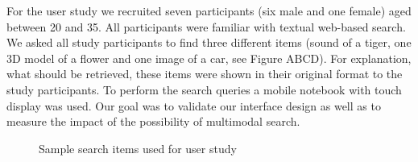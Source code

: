 \documentclass[runningheads,a4paper]{llncs} \usepackage[utf8]{inputenc}
\begin{document}
For the user study we recruited seven participants (six male and one female)
aged between 20 and 35. All participants were familiar with textual web-based
search. We asked all study participants to find three different items (sound of
a tiger, one 3D model of a flower and one image of a car, see Figure ABCD). For
explanation, what should be retrieved, these items were shown in their original
format to the study participants. To perform the search queries a mobile
notebook with touch display was used. Our goal was to validate our interface
design as well as to measure the impact of the possibility of multimodal search. 

\begin{figure}[h!]
\hfill 
{}\hfill 
{}
\caption{Sample search items used for user study}
\end{figure}
\end{document}
